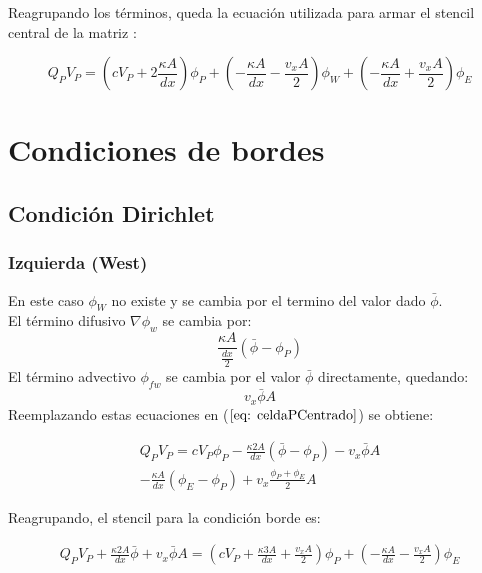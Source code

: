 \documentclass{article}
\begin{document}
        Reagrupando los términos, queda la ecuación utilizada para armar el stencil central de la matriz :

        \begin{equation}
			Q_P V_P = \left( c  V_P + 2 \frac{\kappa A}{dx} \right) \phi_P
			+ \left( -\frac{\kappa A}{dx} - \frac{v_x A}{2} \right) \phi_W
			+ \left( -\frac{\kappa A}{dx} + \frac{v_x A}{2} \right) \phi_E
            \label{eq: stencilCentral}
        \end{equation}

\section{Condiciones de bordes}
    \subsection{Condición Dirichlet} 
    \subsubsection{Izquierda (West)}
        En este caso $\phi_W$ no existe y se cambia por el termino del valor dado $\bar{\phi}$. \\
        El término difusivo $\nabla \phi_w$ se cambia por:
        \begin{equation*}
        \frac{\kappa A}{\frac{dx}{2}} \left( \bar{\phi} - \phi_P \right)
        \end{equation*}{}
        El término advectivo $\phi_{fw}$ se cambia por el valor $\bar{\phi}$ directamente, quedando:
        \begin{equation*}
            v_x \bar{\phi} A
        \end{equation*}
        Reemplazando estas ecuaciones en ($\ref{eq: celdaPCentrado}$) se obtiene:
        
        \begin{multline*}
    	    Q_P V_P = c  V_P \phi_P - \frac{\kappa 2 A}{dx} \left( \bar{\phi} - \phi_P \right) - v_x \bar{\phi} A \\ 
    	        - \frac{\kappa A}{dx} \left( \phi_E - \phi_P \right) + v_x \frac{\phi_P +  \phi_E}{2} A
        \end{multline*}
        
        Reagrupando, el stencil para la condición borde es:
        
        \begin{multline}
    	    Q_P V_P + \frac{\kappa 2 A}{dx} \bar{\phi} + v_x \bar{\phi} A = (c  V_P  + \frac{\kappa 3 A}{dx} + \frac{v_x A}{2}) \phi_P 
    	    + ( -\frac{\kappa A}{dx} - \frac{v_x A}{2}) \phi_E
    	    \label{eq:stencilDirW}
        \end{multline}
\end{document}
